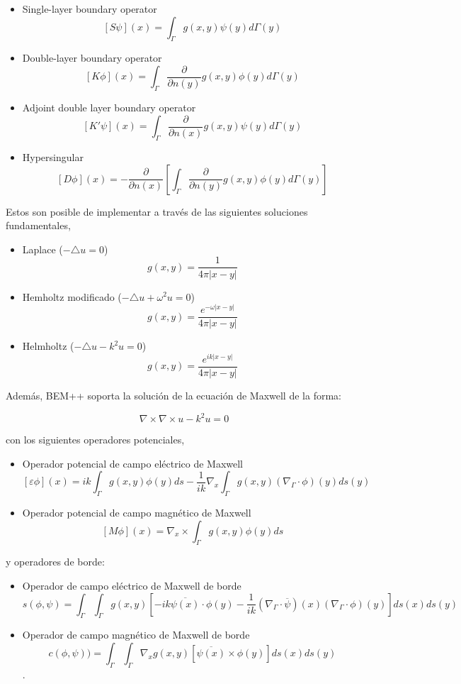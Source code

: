 \documentclass[12pt,letterpaper]{article}
\numberwithin{equation}{section}
\begin{document}
\begin{itemize}
	\item Single-layer boundary operator 
	$$[S\psi](x)=\int_{\Gamma}g(x,y)\psi(y) d\varGamma(y)$$
	\item Double-layer boundary operator $$[K\phi](x)=\int_{\Gamma}\frac{\partial}{\partial n(y)} g(x,y)\phi(y) d\varGamma(y)$$
	\item Adjoint double layer boundary operator
	$$[K'\psi](x)=\int_{\Gamma}\frac{\partial}{\partial n(x)}g(x,y)\psi(y) d\varGamma(y)$$
	\item Hypersingular
	$$[D\phi](x)=-\frac{\partial}{\partial n(x)}\left[ \int_{\Gamma}\frac{\partial}{\partial n(y)} g(x,y)\phi(y) d\varGamma(y)\right]$$
\end{itemize}

Estos son posible de implementar a través de las siguientes soluciones fundamentales,

\begin{itemize}
	\item Laplace ($-\triangle u=0$)
	$$g(x,y)=\frac{1}{4\pi |x-y|}$$
	\item Hemholtz modificado ($-\triangle u+\omega^2u=0$)
	$$g(x,y)=\frac{e^{-\omega|x-y|}}{4\pi |x-y|}$$
	\item Helmholtz ($-\triangle u-k^2u=0$)
	$$g(x,y)=\frac{e^{ik|x-y|}}{4\pi |x-y|}$$
\end{itemize}

Además, BEM++ soporta la solución de la ecuación de Maxwell de la forma:

$$\nabla\times\nabla\times u-k^2u=0$$

\noindent con los siguientes operadores potenciales,
\begin{itemize}
	\item Operador potencial de campo eléctrico de Maxwell 
	$$\left[\varepsilon\phi \right](x)=ik\int_{\Gamma}g(x,y)\phi(y)ds-\frac{1}{ik}\nabla_x\int_{\Gamma}g(x,y)(\nabla_\Gamma\cdotp\phi)(y)ds(y)$$
	\item Operador potencial de campo magnético de Maxwell
	$$\left[M\phi \right](x)=\nabla_x\times\int_{\Gamma}g(x,y)\phi(y)ds$$
\end{itemize}

\noindent y operadores de borde:
\begin{itemize}
	\item Operador de campo eléctrico de Maxwell de borde
	$$s(\phi,\psi)=\int_{\Gamma}\int_{\Gamma}g(x,y)\left[ -ik\overline{\psi (x)}\cdotp\phi(y)-\frac{1}{ik}\left( \nabla_\Gamma\cdotp\overline{\psi}\right) (x)\left( \nabla_\Gamma\cdotp\phi\right) (y)\right] ds(x)ds(y)$$
	\item Operador de campo magnético de Maxwell de borde
	$$c(\phi,\psi))=\int_{\Gamma}\int_{\Gamma}\nabla_xg(x,y)\left[\overline{\psi (x)}\times\phi(y) \right] ds(x)ds(y)$$.
\end{itemize}
\end{document}
